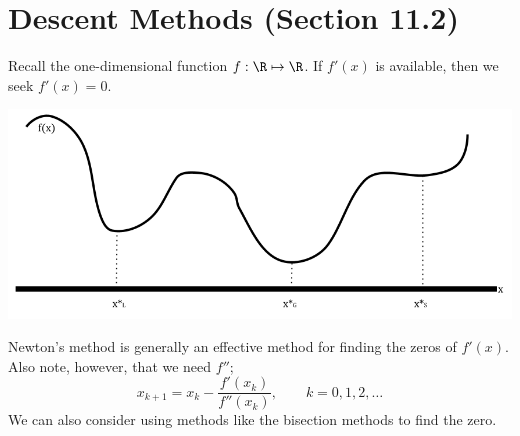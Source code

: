 \documentclass[letterpaper]{article}
\begin{document}
\section{Descent Methods (Section 11.2)}
Recall the one-dimensional function $f: \R \mapsto \R$. If $f'(x)$ is available, then we seek $f'(x) = 0$.
\begin{center}
    \includegraphics[scale=0.5]{../assets/1varopt_ex.png}
\end{center}
Newton's method is generally an effective method for finding the zeros of $f'(x)$. Also note, however, that we need $f''$; 
\[x_{k + 1} = x_{k} - \frac{f'(x_{k})}{f''(x_{k})}, \qquad k = 0, 1, 2, \hdots\]
We can also consider using methods like the bisection methods to find the zero. 
\end{document}
